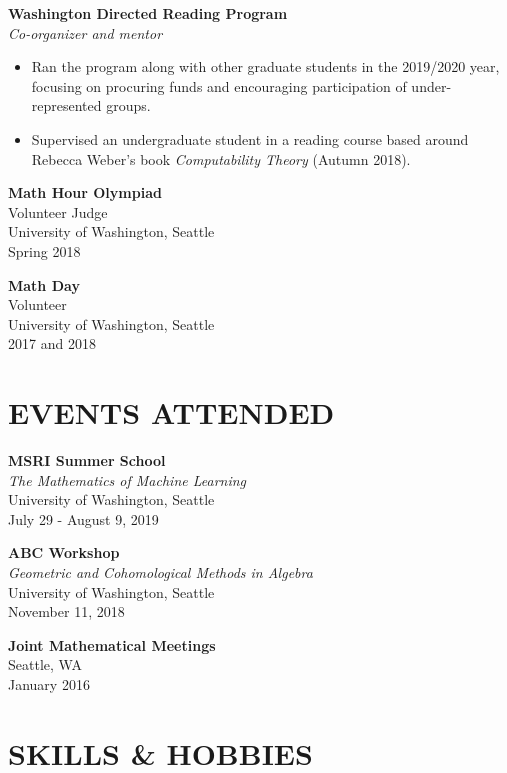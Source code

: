 \documentclass[margin]{res} %
\begin{document}
\begin{resume}
{\bf Washington Directed Reading Program}\\
{\sl Co-organizer and mentor}
\begin{itemize}\itemsep -1pt
	\item Ran the program along with other graduate students in the 2019/2020 year, focusing on procuring funds and encouraging participation of under-represented groups.
	\item Supervised an undergraduate student in a reading course based around Rebecca Weber's book {\sl Computability Theory} (Autumn 2018).
\end{itemize}

{\bf Math Hour Olympiad}\\
Volunteer Judge \\
University of Washington, Seattle\\
Spring 2018

{\bf Math Day}\\
Volunteer\\
University of Washington, Seattle\\
2017 and 2018

\section{\bf EVENTS ATTENDED}

{\bf MSRI Summer School}\\
{\sl The Mathematics of Machine Learning}\\
University of Washington, Seattle\\
July 29 - August 9, 2019

{\bf ABC Workshop}\\
{\sl Geometric and Cohomological Methods in Algebra}\\
University of Washington, Seattle\\
November 11, 2018

{\bf Joint Mathematical Meetings}\\
Seattle, WA\\
January 2016


\section{SKILLS \& HOBBIES} 


\end{resume}
\end{document}
